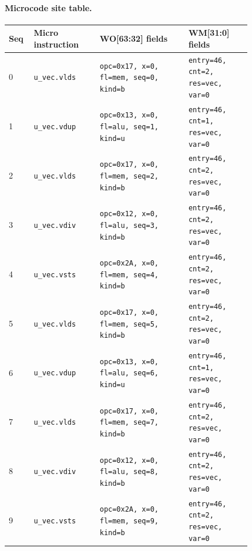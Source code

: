 \paragraph{Microcode site table.}
{\scriptsize
\begin{longtable}{@{}R{0.055\linewidth}L{0.23\linewidth}L{0.31\linewidth}L{0.22\linewidth}@{}}
\toprule
Seq & Micro instruction & WO[63:32] fields & WM[31:0] fields \\
 & \texttt{u\_vec.vlds} & \texttt{opc=0x17, x=0, fl=mem, seq=0, kind=b} & \texttt{entry=46, cnt=2, res=vec, var=0} \\
1 & \texttt{u\_vec.vdup} & \texttt{opc=0x13, x=0, fl=alu, seq=1, kind=u} & \texttt{entry=46, cnt=1, res=vec, var=0} \\
2 & \texttt{u\_vec.vlds} & \texttt{opc=0x17, x=0, fl=mem, seq=2, kind=b} & \texttt{entry=46, cnt=2, res=vec, var=0} \\
3 & \texttt{u\_vec.vdiv} & \texttt{opc=0x12, x=0, fl=alu, seq=3, kind=b} & \texttt{entry=46, cnt=2, res=vec, var=0} \\
4 & \texttt{u\_vec.vsts} & \texttt{opc=0x2A, x=0, fl=mem, seq=4, kind=b} & \texttt{entry=46, cnt=2, res=vec, var=0} \\
5 & \texttt{u\_vec.vlds} & \texttt{opc=0x17, x=0, fl=mem, seq=5, kind=b} & \texttt{entry=46, cnt=2, res=vec, var=0} \\
6 & \texttt{u\_vec.vdup} & \texttt{opc=0x13, x=0, fl=alu, seq=6, kind=u} & \texttt{entry=46, cnt=1, res=vec, var=0} \\
7 & \texttt{u\_vec.vlds} & \texttt{opc=0x17, x=0, fl=mem, seq=7, kind=b} & \texttt{entry=46, cnt=2, res=vec, var=0} \\
8 & \texttt{u\_vec.vdiv} & \texttt{opc=0x12, x=0, fl=alu, seq=8, kind=b} & \texttt{entry=46, cnt=2, res=vec, var=0} \\
9 & \texttt{u\_vec.vsts} & \texttt{opc=0x2A, x=0, fl=mem, seq=9, kind=b} & \texttt{entry=46, cnt=2, res=vec, var=0} \\
\bottomrule
\end{longtable}
}
